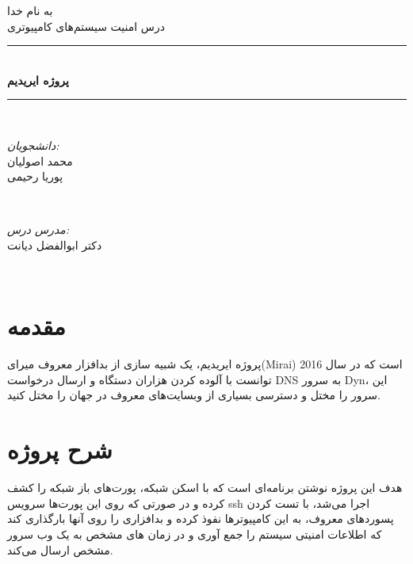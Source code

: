 \documentclass[11pt]{article}
\begin{document}
\begin{titlepage}

\newcommand{\HRule}{\rule{\linewidth}{0.5mm}}

\center 

\textsc{\LARGE به نام خدا}\\[1.5cm] 


\textsc{\Large درس امنیت سیستم‌های کامپیوتری}\\[0.5cm] 

\HRule \\[0.4cm]
{ \huge \bfseries پروژه ایریدیم}\\[0.4cm] 
\HRule \\[1.5cm]

\begin{minipage}{0.4\textwidth}
\begin{flushright} \large
\emph{دانشجویان:}\\
 محمد اصولیان\\
  پوریا رحیمی\\
\end{flushright}
\end{minipage}
~
\begin{minipage}{0.4\textwidth}
\begin{flushright} \large
\emph{مدرس درس: } \\
دکتر ابوالفضل دیانت \\
\end{flushright}
\end{minipage}\\[2cm]

\end{titlepage}

\newpage
\section{مقدمه}
پروژه ایریدیم، یک شبیه سازی از بدافزار معروف میرای(Mirai) است که در سال 2016 توانست با آلوده کردن هزاران دستگاه و ارسال درخواست DNS به سرور Dyn، این سرور را مختل و دسترسی بسیاری از وبسایت‌های معروف در جهان را مختل کنید.

\section{شرح پروژه}
هدف این پروژه نوشتن برنامه‌ای است که با اسکن شبکه، پورت‌های باز شبکه را کشف کرده و در صورتی که روی این پورت‌ها سرویس ssh اجرا می‌شد، با تست کردن پسوردهای معروف، به این کامپیوترها نفوذ کرده و بدافزاری را روی آنها بارگذاری کند که اطلاعات امنیتی سیستم را جمع آوری و در زمان های مشخص به یک وب سرور مشخص ارسال می‌کند.
\end{document}

